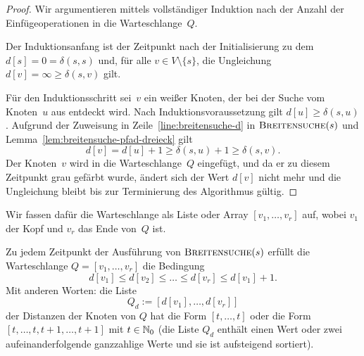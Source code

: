 \begin{proof}
Wir argumentieren mittels vollständiger Induktion nach der Anzahl der Ein\-füge\-operationen in die Warteschlange~$Q$.

Der Induktionsanfang ist der Zeitpunkt nach der Initialisierung zu dem $d[s]=0=\delta(s,s)$ und, für alle $v \in V \setminus \{s\}$, die Ungleichung $d[v]=\infty\geq\delta(s,v)$ gilt.

Für den Induktionsschritt sei~$v$ ein weißer Knoten, der bei der Suche vom Knoten~$u$ aus entdeckt wird.
Nach Induktionsvoraussetzung gilt $d[u] \geq \delta(s,u)$.
Aufgrund der Zuweisung in Zeile~\ref{line:breitensuche-d} in $\mathop{\text{\textsc{Breitensuche}}}(s)$ und Lemma~\ref{lem:breitensuche-pfad-dreieck} gilt
\[
d[v] = d[u] + 1 \geq \delta(s,u) + 1 \geq \delta(s,v).
\]
Der Knoten~$v$ wird in die Warteschlange~$Q$ eingefügt, und da er zu diesem Zeitpunkt grau gefärbt wurde, ändert sich der Wert $d[v]$ nicht mehr und die Ungleichung bleibt bis zur Terminierung des Algorithmus gültig.
\end{proof}

\begin{bem} 
Wir fassen dafür die Warteschlange als Liste oder Array $[v_1,\ldots,v_r]$ auf, wobei $v_1$ der Kopf und $v_r$ das Ende von~$Q$ ist.
\end{bem} 

\begin{lem}
\label{lem:breitensuche-warteschlange-monotonie}
Zu jedem Zeitpunkt der Ausführung von $\mathop{\text{\textsc{Breitensuche}}}(s)$ erfüllt die Warteschlange $Q=[v_1,\ldots,v_r]$ die Bedingung
\[
d[v_1] \leq d[v_2] \leq \ldots \leq d[v_r] \leq d[v_1] + 1.
\]
Mit anderen Worten: die Liste 
\[
	Q_d:=[d[v_1],\ldots,d[v_r]]
\] der Distanzen der Knoten von $Q$ hat die Form $[t,\ldots,t]$ oder die Form $[t,\ldots,t,t+1,\ldots,t+1]$ mit $t \in \mathbb{N}_0$ (die Liste $Q_d$ enthält einen Wert oder zwei aufeinanderfolgende ganzzahlige Werte und sie ist aufsteigend sortiert). 
\end{lem}


